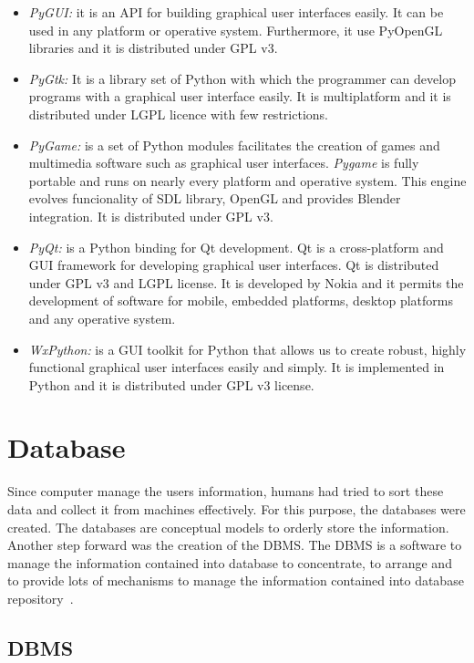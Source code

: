 \begin{itemize}
\item \emph {PyGUI:} it is an \ac{API} for building graphical user interfaces
  easily. It can be used in any platform or
  operative system. Furthermore, it use  PyOpenGL libraries and it is distributed under \ac{GPL} v3.
\item \emph{PyGtk:} It is a library set of Python with which the programmer can
  develop  programs with a graphical user interface easily. It is multiplatform
  and it is distributed under \ac{LGPL} licence with few restrictions.
\item \emph{PyGame:} is a set of Python modules facilitates the creation of games and
  multimedia software such as graphical user interfaces. \emph{Pygame} is fully portable and
  runs on nearly every platform and operative system. This engine evolves
  funcionality of \ac{SDL} library, OpenGL and provides Blender integration. It is
  distributed under \ac{GPL} v3.
\item \emph{PyQt:} is a Python binding for Qt development. Qt is a
  cross-platform  and \ac{GUI} framework for  developing graphical user interfaces. Qt
  is distributed under \ac{GPL} v3 and \ac{LGPL} license. It is developed by Nokia and it
  permits the development of software for mobile, embedded platforms, desktop platforms
  and any operative system.
\item \emph{WxPython:} is a \ac{GUI} toolkit for Python that allows us to create
  robust, highly functional graphical user interfaces easily and simply. It is
  implemented in Python and it is distributed under \ac{GPL} v3 license.
\end{itemize}


\section{Database}
Since computer manage the users information, humans had tried to sort these data
and collect it from machines effectively. For this purpose, the databases were
created. The databases are conceptual models to orderly store the information. Another step forward was the creation of the \ac{DBMS}. The \ac{DBMS}
is a software to manage the information contained into database to concentrate,
to arrange and to provide lots of mechanisms to manage the information contained
into database repository~\cite{Group2010}.

\subsection{DBMS}

